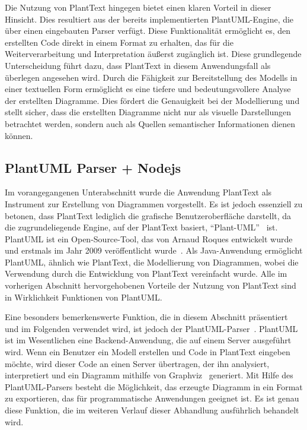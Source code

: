 Die Nutzung von PlantText hingegen bietet einen klaren Vorteil in dieser Hinsicht. Dies resultiert aus der bereits
implementierten PlantUML-Engine, die über einen eingebauten Parser verfügt. Diese Funktionalität ermöglicht es,
den erstellten Code direkt in einem Format zu erhalten, das für die Weiterverarbeitung und Interpretation äußerst zugänglich ist.
Diese grundlegende Unterscheidung führt dazu, dass PlantText in diesem Anwendungsfall als überlegen angesehen wird.
Durch die Fähigkeit zur Bereitstellung des Modells in einer textuellen Form ermöglicht es eine tiefere und
bedeutungsvollere Analyse der erstellten Diagramme. Dies fördert die Genauigkeit bei der Modellierung und stellt sicher,
dass die erstellten Diagramme nicht nur als visuelle Darstellungen betrachtet werden, sondern auch als Quellen
semantischer Informationen dienen können.

\subsection{PlantUML Parser + Nodejs}

Im vorangegangenen Unterabschnitt wurde die Anwendung PlantText als Instrument zur Erstellung von Diagrammen
vorgestellt. Es ist jedoch essenziell zu betonen, dass PlantText lediglich die grafische Benutzeroberfläche darstellt,
da die zugrundeliegende Engine, auf der PlantText basiert, ``Plant-UML''~\cite{plantUML} ist. PlantUML ist ein Open-Source-Tool,
das von Arnaud Roques entwickelt wurde und erstmals im Jahr 2009 veröffentlicht wurde~\cite{plantUML}. Als Java-Anwendung
ermöglicht PlantUML, ähnlich wie PlantText, die Modellierung von Diagrammen, wobei die Verwendung durch die Entwicklung
von PlantText vereinfacht wurde. Alle im vorherigen Abschnitt hervorgehobenen Vorteile der Nutzung von PlantText sind in
Wirklichkeit Funktionen von PlantUML.

Eine besonders bemerkenswerte Funktion, die in diesem Abschnitt präsentiert und im Folgenden verwendet wird, ist jedoch
der PlantUML-Parser~\cite{plantUMLParser}. PlantUML ist im Wesentlichen eine Backend-Anwendung, die auf einem Server
ausgeführt wird. Wenn ein Benutzer ein Modell erstellen und Code in PlantText eingeben möchte, wird dieser Code an einen Server
übertragen, der ihn analysiert, interpretiert und ein Diagramm mithilfe von Graphviz~\cite{graphViz} generiert. Mit
Hilfe des PlantUML-Parsers besteht die Möglichkeit, das erzeugte Diagramm in ein Format zu exportieren, das für
programmatische Anwendungen geeignet ist. Es ist genau diese Funktion, die im weiteren Verlauf dieser Abhandlung
ausführlich behandelt wird.

